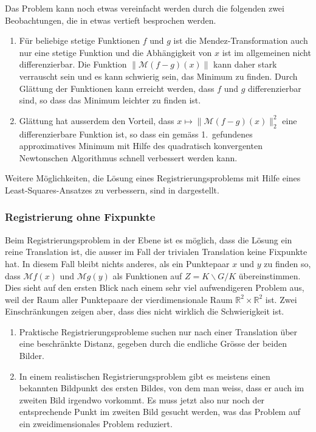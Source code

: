 Das Problem kann noch etwas vereinfacht werden durch die folgenden zwei
Beobachtungen, die in \cite{mendez-mueller} etwas vertieft besprochen
werden.
\begin{enumerate}
\item
Für beliebige stetige Funktionen $f$ und $g$ ist die
Mendez-Transformation auch nur eine stetige Funktion und die
Abhängigkeit von $x$ ist im allgemeinen nicht differenzierbar.
Die Funktion $\|\mathcal{M}(f-g)(x)\|$ kann daher stark verrauscht
sein und es kann schwierig sein, das Minimum zu finden.
Durch Glättung der Funktionen kann erreicht werden, dass $f$ und $g$
differenzierbar sind, so dass das Minimum leichter zu finden ist.
\item
Glättung hat ausserdem den Vorteil, dass $x\mapsto\|\mathcal{M}(f-g)(x)\|_2^2$
eine differenzierbare Funktion ist, so dass ein gemäss 1.~gefundenes
approximatives Minimum mit Hilfe des quadratisch konvergenten Newtonschen
Algorithmus schnell verbessert werden kann.
\end{enumerate}

Weitere Möglichkeiten, die Lösung eines Registrierungsproblems mit
Hilfe eines Least-Squares-Ansatzes zu verbessern, sind in
\cite[chapter 3]{buch:reg} dargestellt.

%
%
\subsubsection{Registrierung ohne Fixpunkte}
Beim Registrierungsproblem in der Ebene ist es möglich, dass die
Lösung ein reine Translation ist, die ausser im Fall der trivialen
Translation keine Fixpunkte hat.
In diesem Fall bleibt nichts anderes, als ein Punktepaar $x$ und $y$
zu finden so, dass $\mathcal{M}f(x)$ und $\mathcal{M}g(y)$ als Funktionen
auf $Z=K\backslash G/K$ übereinstimmen.
Dies sieht auf den ersten Blick nach einem sehr viel aufwendigeren
Problem aus, weil der Raum aller Punktepaare der vierdimensionale
Raum $\mathbb{R}^2\times\mathbb{R}^2$ ist.
Zwei Einschränkungen zeigen aber, dass dies nicht wirklich die
Schwierigkeit ist.
\begin{enumerate}
\item
Praktische Registrierungsprobleme suchen nur nach einer Translation
über eine beschränkte Distanz, gegeben durch die endliche Grösse 
der beiden Bilder.
\item
In einem realistischen Registrierungsproblem gibt es meistens einen
bekannten Bildpunkt des ersten Bildes, von dem man weiss, dass er auch
im zweiten Bild irgendwo vorkommt.
Es muss jetzt also nur noch der entsprechende Punkt im zweiten Bild
gesucht werden, was das Problem auf ein zweidimensionales Problem
reduziert.
\end{enumerate}




